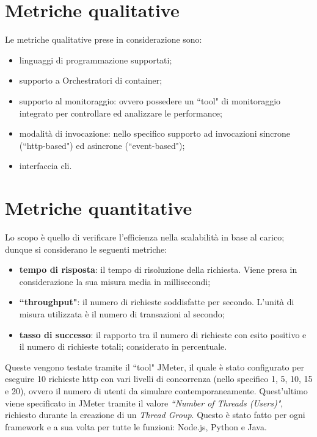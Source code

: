 \documentclass[12pt,a4paper,openany,twoside]{book}
\begin{document}
\section{Metriche qualitative}
\label{sec:metriche-qualitative}

Le metriche qualitative prese in considerazione sono:
\begin{itemize}
    \item linguaggi di programmazione supportati;
    
    \item supporto a Orchestratori di container;
    
    \item supporto al monitoraggio: ovvero possedere un ``tool" di monitoraggio integrato per controllare ed analizzare le performance;
    
    \item modalità di invocazione: nello specifico supporto ad invocazioni sincrone (``\ac{http}-based") ed asincrone (``event-based");
    
    \item interfaccia \ac{cli}.
\end{itemize}


\section{Metriche quantitative}
\label{sec:metriche-quantitative}

Lo scopo è quello di verificare l'efficienza nella scalabilità in base al carico; dunque si considerano le seguenti metriche:
\begin{itemize}
    \item \textbf{tempo di risposta}: il tempo di risoluzione della richiesta. Viene presa in considerazione la sua misura media in millisecondi;
    
    \item \textbf{``throughput"}: il numero di richieste soddisfatte per secondo. L'unità di misura utilizzata è il numero di transazioni al secondo;
    
    \item \textbf{tasso di successo}: il rapporto tra il numero di richieste con esito positivo e il numero di richieste totali; considerato in percentuale.
\end{itemize}
Queste vengono testate tramite il ``tool" JMeter, il quale è stato configurato per eseguire 10 richieste \ac{http} con vari livelli di concorrenza (nello specifico 1, 5, 10, 15 e 20), ovvero il numero di utenti da simulare contemporaneamente. Quest'ultimo viene specificato in JMeter tramite il valore \textit{``Number of Threads (Users)"}, richiesto durante la creazione di un \textit{Thread Group}. Questo è stato fatto per ogni framework e a sua volta per tutte le funzioni: Node.js, Python e Java.
\end{document}
